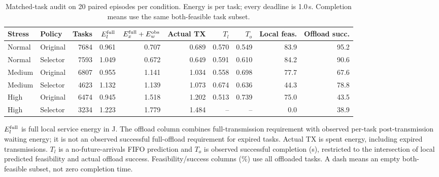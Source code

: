 \begin{table}[t]
\centering\footnotesize
\caption{Matched-task audit on 20 paired episodes per condition. Energy is per task; every deadline is 1.0\,s. Completion means use the same both-feasible task subset.}
\label{tab:counter}
\begin{tabular}{@{}llrrrrrrrr@{}}\toprule
Stress & Policy & Tasks & $E_l^{\rm full}$ & $E_x^{\rm full}+E_w^{\rm obs}$ & Actual TX & $T_l$ & $T_o$ & Local feas. & Offload succ.\\\midrule
Normal & Original & 7684 & 0.961 & 0.707 & 0.689 & 0.570 & 0.549 & 83.9 & 95.2 \\
Normal & Selector & 7593 & 1.049 & 0.672 & 0.649 & 0.591 & 0.610 & 84.2 & 90.6 \\
Medium & Original & 6807 & 0.955 & 1.141 & 1.034 & 0.558 & 0.698 & 77.7 & 67.6 \\
Medium & Selector & 4623 & 1.132 & 1.139 & 1.073 & 0.674 & 0.636 & 44.3 & 78.8 \\
High & Original & 6474 & 0.945 & 1.518 & 1.202 & 0.513 & 0.739 & 75.0 & 43.5 \\
High & Selector & 3234 & 1.223 & 1.779 & 1.484 & -- & -- & 0.0 & 38.9 \\
\bottomrule\end{tabular}

\par\smallskip\begin{minipage}{\textwidth}\footnotesize $E_l^{\rm full}$ is full local service energy in J. The offload column combines full-transmission requirement with observed per-task post-transmission waiting energy; it is not an observed successful full-offload requirement for expired tasks. Actual TX is spent energy, including expired transmissions. $T_l$ is a no-future-arrivals FIFO prediction and $T_o$ is observed successful completion (s), restricted to the intersection of local predicted feasibility and actual offload success. Feasibility/success columns (\%) use all offloaded tasks. A dash means an empty both-feasible subset, not zero completion time.\end{minipage}
\end{table}
